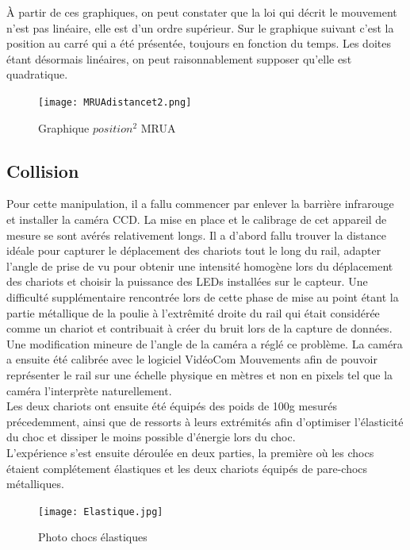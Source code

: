 À partir de ces graphiques, on peut constater que la loi qui décrit le mouvement n'est pas linéaire, elle est d'un ordre supérieur. Sur le graphique suivant c'est la position au carré qui a été présentée, toujours en fonction du temps. Les doites étant désormais linéaires, on peut raisonnablement supposer qu'elle est quadratique.

\begin{figure}[h]
    \caption[Graphique $position^2$ MRUA]{Graphique $position^2$ MRUA}
    \centering
    \texttt{[image: MRUAdistancet2.png]}
\end{figure}

\newpage
\subsection{Collision}
Pour cette manipulation, il a fallu commencer par enlever la barrière infrarouge et installer la caméra CCD.
La mise en place et le calibrage de cet appareil de mesure se sont avérés relativement longs. Il a d'abord fallu trouver la distance idéale pour capturer le déplacement des chariots tout le long du rail, adapter l'angle de prise de vu pour obtenir une intensité homogène lors du déplacement des chariots et choisir la puissance des LEDs installées sur le capteur.
Une difficulté supplémentaire rencontrée lors de cette phase de mise au point étant la partie métallique de la poulie à l'extrêmité droite du rail qui était considérée comme un chariot et contribuait à créer du bruit lors de la capture de données. Une modification mineure de l'angle de la caméra a réglé ce problème.
La caméra a ensuite été calibrée avec le logiciel VidéoCom Mouvements afin de pouvoir représenter le rail sur une échelle physique en mètres et non en pixels tel que la caméra l'interprète naturellement.\\
Les deux chariots ont ensuite été équipés des poids de 100g mesurés précedemment, ainsi que de ressorts à leurs extrémités afin d'optimiser l'élasticité du choc et dissiper le moins possible d'énergie lors du choc. \\

L'expérience s'est ensuite déroulée en deux parties, la première où les chocs étaient complétement élastiques et les deux chariots équipés de pare-chocs métalliques.

\begin{figure}[h]
    \caption[Photo]{Photo chocs élastiques}
    \centering
    \texttt{[image: Elastique.jpg]}
\end{figure}

